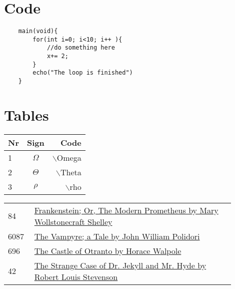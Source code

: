 \documentclass[a4paper]{article}
\begin{document}
\begin{multicols}{3}
    \section{Code}
    \begin{lstlisting}
    main(void){
        for(int i=0; i<10; i++ ){
            //do something here 
            x+= 2;
        }
        echo("The loop is finished")
    }
    \end{lstlisting}


    \section{Tables}
    \begin{tabular}{l|c|r}
        Nr & Sign     & Code              \\\hline
        1  & $\Omega$ & $\backslash$Omega \\
        2  & $\Theta$ & $\backslash$Theta \\
        3  & $\rho$   & $\backslash$rho
    \end{tabular}

    \begin{tabular}{L{0.1\linewidth}|R{0.8\linewidth}}\scriptsize
        84   & \href{http://www.gutenberg.org/ebooks/84}{Frankenstein; Or, The Modern Prometheus by Mary Wollstonecraft Shelley} \\
        6087 & \href{https://www.gutenberg.org/ebooks/6087}{The Vampyre; a Tale by John William Polidori}                        \\
        696  & \href{https://www.gutenberg.org/ebooks/696}{The Castle of Otranto by Horace Walpole}                              \\
        42   & \href{https://www.gutenberg.org/ebooks/42}{The Strange Case of Dr. Jekyll and Mr. Hyde by Robert Louis Stevenson}
    \end{tabular}

\end{multicols}



\end{document}
